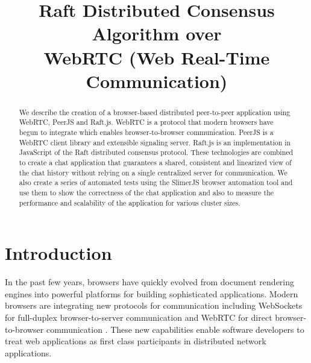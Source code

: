 \documentclass[conference,compsoc]{./IEEEtran/IEEEtran}
\begin{document}
\title{Raft Distributed Consensus Algorithm over\\ WebRTC (Web Real-Time Communication)}

\author{
\and
{}
}

\maketitle

\begin{abstract}
We describe the creation of a browser-based distributed peer-to-peer
application using WebRTC, PeerJS and Raft.js. WebRTC is a protocol
that modern browsers have begun to integrate which enables
browser-to-browser communication. PeerJS is a WebRTC client library
and extensible signaling server. Raft.js is an implementation in
JavaScript of the Raft distributed consensus protocol. These
technologies are combined to create a chat application that guarantees
a shared, consistent and linearized view of the chat history without
relying on a single centralized server for communication. We also
create a series of automated tests using the SlimerJS browser
automation tool and use them to show the correctness of the chat
application and also to measure the performance and scalability of the
application for various cluster sizes.
\end{abstract}

\section{Introduction}
In the past few years, browsers have quickly evolved from document
rendering engines into powerful platforms for building sophisticated
applications. Modern browsers are integrating new protocols for
communication including WebSockets for full-duplex browser-to-server
communication \cite{websockets:rfc6455} and WebRTC for direct
browser-to-browser communication \cite{webrtc:feb2015}. These new
capabilities enable software developers to treat web applications as
first class participants in distributed network applications.
\end{document}

